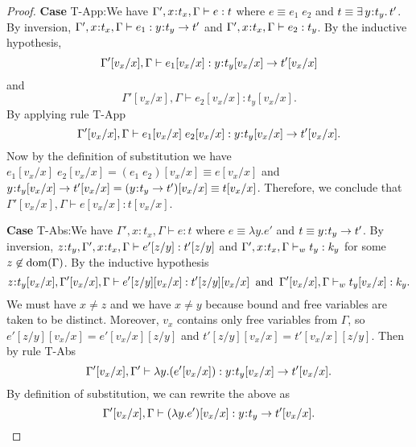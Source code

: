 \documentclass[11pt]{article}
\newcommand{\bind}{\hspace{0.05em}{:}\hspace{0.05em}} %
\newcommand{\existype}[3]{\exists\, #1\bind #2.\, #3}
\newcommand{\functype}[3]{#1\bind #2 \rightarrow #3}
\newcommand{\dom}[1]{{\rm dom}(#1)}
\begin{document}
\begin{proof}
{\bf Case} {\sc T-App}:We have $\Gamma', x\bind t_x,\Gamma \vdash e : t$ where $e \equiv e_1\; e_2$ and $t \equiv \existype{y}{t_y}{t'}$. 
By inversion, $\Gamma', x\bind t_x, \Gamma \vdash e_1 : \functype{y}{t_y}{t'}$ and $\Gamma', x\bind t_x, \Gamma \vdash e_2 : t_y$. By the inductive hypothesis,
\begin{equation}\label{361}
\Gamma'[v_x/x],\Gamma\vdash e_1[v_x/x] : \functype{y}{t_y[v_x/x]}{t'[v_x/x]}
\end{equation}
and
\begin{equation}\label{362}
\Gamma'[v_x/x],\Gamma\vdash e_2[v_x/x] : t_y[v_x/x].
\end{equation}
By applying rule {\sc T-App}
\begin{equation}
\Gamma'[v_x/x],\Gamma\vdash e_1[v_x/x]\;e_2[v_x/x] : \functype{y}{t_y[v_x/x]}{t'[v_x/x]}.
\end{equation}
Now by the definition of substitution we have $e_1[v_x/x]\; e_2[v_x/x] = (e_1\;e_2)[v_x/x] \equiv e[v_x/x]$ and $\functype{y}{t_y[v_x/x]}{t'[v_x/x]} = (\functype{y}{t_y}{t'})[v_x/x] \equiv t[v_x/x]$. Therefore, we conclude that
$\Gamma'[v_x/x],\Gamma \vdash e[v_x/x] : t[v_x/x]$.

{\bf Case} {\sc T-Abs}:We have $\Gamma', x:t_x,\Gamma \vdash e : t$ where $e \equiv \lambda y. e'$ and $t \equiv \functype{y}{t_y}{t'}$. By inversion, $z\bind t_y, \Gamma', x\bind t_x,\Gamma \vdash e'[z/y] : t'[z/y]$ and $\Gamma', x\bind  t_x,\Gamma \vdash_w t_y : k_y$ for some $z\not\in\dom{\Gamma}$. By the inductive hypothesis
\begin{equation}
z\bind t_y[v_x/x], \Gamma'[v_x/x],\Gamma \vdash e'[z/y][v_x/x] : t'[z/y][v_x/x] \;\;{\rm and}\;\; \Gamma'[v_x/x],\Gamma \vdash_w t_y[v_x/x] : k_y.
\end{equation}
We must have $x\neq z$ and we have $x \neq y$ because bound and free variables are taken to be distinct. Moreover, $v_x$ contains only free variables from $\Gamma$, so $e'[z/y][v_x/x] = e'[v_x/x][z/y]$ and $t'[z/y][v_x/x] = t'[v_x/x][z/y]$. Then by rule {\sc T-Abs}
\begin{equation}
\Gamma'[v_x/x], \Gamma' \vdash \lambda y.(e'[v_x/x]) : \functype{y}{t_y[v_x/x]}{t'[v_x/x]}.
\end{equation}
By definition of substitution, we can rewrite the above as
\[
\Gamma'[v_x/x],\Gamma \vdash (\lambda y.e')[v_x/x] : \functype{y}{t_y}{t'}[v_x/x].
\]


\end{proof}
\end{document}
